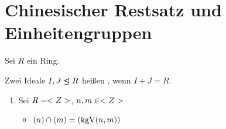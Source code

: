 \section{Chinesischer Restsatz und Einheitengruppen}

Sei $R$ ein Ring.

\begin{definition}[teilerfremd]
	Zwei Ideale $I,J \properideal R$ heißen , wenn $I+J = R$.
\end{definition}

\begin{example}
	\begin{enumerate}
		\item Sei $R = <Z>$, $n,m \in <Z>$
			\begin{itemize}
				\item $(n) \cap (m) = (\operatorname{kgV}(n,m))$
			\end{itemize}
	\end{enumerate}
\end{example}